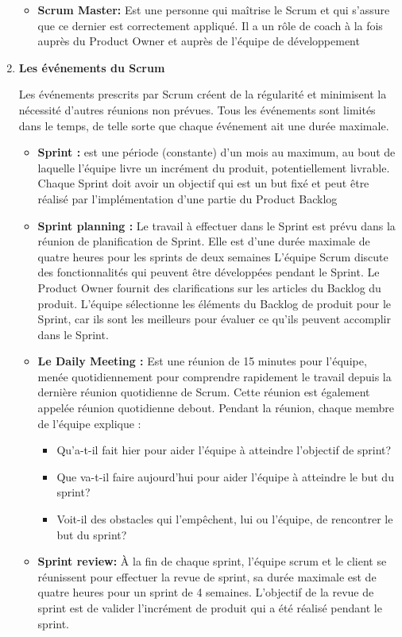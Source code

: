 \documentclass[11pt,a4paper]{article}
\begin{document}
\begin{enumerate}
\begin{itemize}
	\item \textbf{Scrum Master:} Est une personne qui maîtrise le Scrum et qui s’assure que ce dernier est correctement appliqué. Il a un rôle de coach à la fois auprès du Product Owner et auprès de l’équipe de développement
	\end{itemize}

\item \textbf{Les événements du Scrum}

Les événements prescrits par Scrum créent de la régularité et minimisent la nécessité d’autres réunions non prévues. Tous les événements sont limités dans le temps, de telle sorte que chaque événement ait une durée maximale. 

\begin{itemize}
\item \textbf{Sprint :} est une période (constante) d’un mois au maximum, au bout de laquelle l’équipe livre un incrément du produit, potentiellement livrable. Chaque Sprint doit avoir un objectif qui est un but fixé et peut être réalisé par l’implémentation d’une partie du Product Backlog

\item \textbf{Sprint planning :} Le travail à effectuer dans le Sprint est prévu dans la réunion de planification de Sprint. Elle est d'une durée maximale de quatre heures pour les sprints de deux semaines L'équipe Scrum discute des fonctionnalités qui peuvent être développées pendant le Sprint. Le Product Owner fournit des clarifications sur les articles du Backlog du produit. L'équipe sélectionne les éléments du Backlog de produit pour le Sprint, car ils sont les meilleurs pour évaluer ce qu'ils peuvent accomplir dans le Sprint.

\item \textbf{Le Daily Meeting :} Est une réunion de 15 minutes pour l'équipe, menée quotidiennement pour comprendre rapidement le travail depuis la dernière réunion quotidienne de Scrum. Cette réunion est également appelée réunion quotidienne debout. Pendant la réunion, chaque membre de l'équipe explique :

\begin{itemize}
\item Qu'a-t-il fait hier pour aider l'équipe à atteindre l'objectif de sprint?
\item Que va-t-il faire aujourd'hui pour aider l'équipe à atteindre le but du sprint?
\item Voit-il des obstacles qui l'empêchent, lui ou l'équipe, de rencontrer le but du sprint?
\end{itemize}
\item \textbf{Sprint review:} À la fin de chaque sprint, l'équipe scrum et le client se réunissent pour effectuer la revue de sprint, sa durée maximale est de quatre heures pour un sprint de 4 semaines. L'objectif de la revue de sprint est de valider l'incrément de produit qui a été réalisé pendant le sprint.


\end{itemize}
\end{enumerate}
\end{document}
